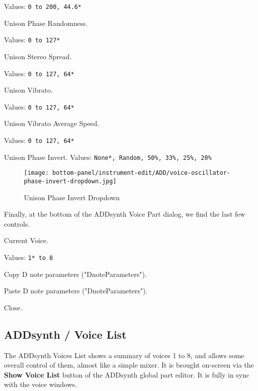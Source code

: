    Values: \texttt{0 to 200, 44.6*}

   Unison Phase Randomness.

   Values: \texttt{0 to 127*}

   Unison Stereo Spread.

   Values: \texttt{0 to 127, 64*}

   Unison Vibrato.

   Values: \texttt{0 to 127, 64*}

   Unison Vibrato Average Speed.

   Values: \texttt{0 to 127, 64*}

   Unison Phase Invert.
   Values: \texttt{None*, Random, 50\%, 33\%, 25\%, 20\%}

\begin{figure}[H]
   \centering 
   \texttt{[image: bottom-panel/instrument-edit/ADD/voice-oscillator-phase-invert-dropdown.jpg]}
   \caption{Unison Phase Invert Dropdown}
   \label{fig:phase_invert_dropdown}
\end{figure}

   Finally, at the bottom of the ADDsynth Voice Part dialog, we find the
   last few controls.

   \setcounter{ItemCounter}{0}      %

   Current Voice.

   Values: \texttt{1* to 8}

   Copy D note parameters ("DnoteParameters").

   Paste D note parameters ("DnoteParameters").

   Close.

\subsection{ADDsynth / Voice List}
\label{subsec:addsynth_voice_list}

   The ADDsynth Voices List shows a summary of voices 1 to 8, and allows
   some overall control of them, almost like a simple mixer.
   It is brought on-screen via the \textbf{Show Voice List} button
   of the ADDsynth global part editor.
   It is fully in sync with the voice windows.

